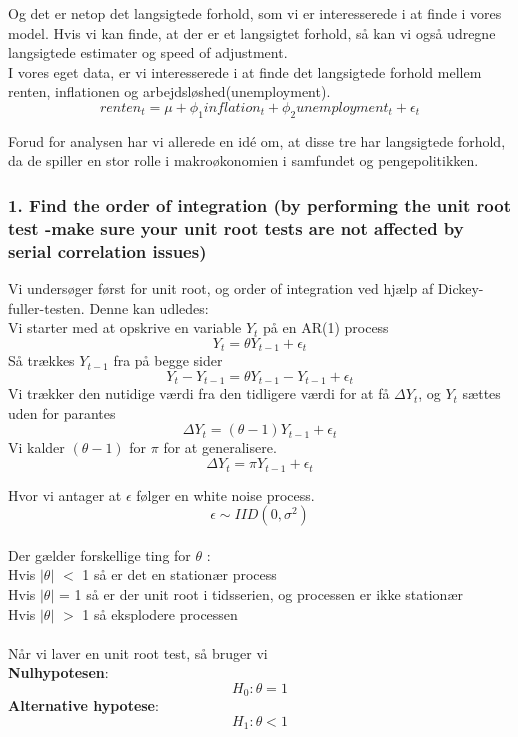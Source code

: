 \documentclass[
  10pt,
]{article}
\begin{document}
Og det er netop det langsigtede forhold, som vi er interesserede i at
finde i vores model. Hvis vi kan finde, at der er et langsigtet forhold,
så kan vi også udregne langsigtede estimater og speed of adjustment.\\
I vores eget data, er vi interesserede i at finde det langsigtede
forhold mellem renten, inflationen og arbejdsløshed(unemployment).
\[renten_t = \mu + \phi_1 inflation_t + \phi_2 unemployment_t + \epsilon_t \]

Forud for analysen har vi allerede en idé om, at disse tre har
langsigtede forhold, da de spiller en stor rolle i makroøkonomien i
samfundet og pengepolitikken.

\newpage

\hypertarget{find-the-order-of-integration-by-performing-the-unit-root-test--make-sure-your-unit-root-tests-are-not-affected-by-serial-correlation-issues}{%
\subsubsection{1. Find the order of integration (by performing the unit
root test -make sure your unit root tests are not affected by serial
correlation
issues)}\label{find-the-order-of-integration-by-performing-the-unit-root-test--make-sure-your-unit-root-tests-are-not-affected-by-serial-correlation-issues}}

Vi undersøger først for unit root, og order of integration ved hjælp af
Dickey-fuller-testen. Denne kan udledes:\\

Vi starter med at opskrive en variable \(Y_t\) på en AR(1) process\\
\[Y_t = \theta Y_{t-1} + \epsilon_t\] Så trækkes \(Y_{t-1}\) fra på
begge sider \[ Y_{t} - Y_{t-1}=\theta Y_{t-1}-Y_{t-1}+\epsilon_{t} \] Vi
trækker den nutidige værdi fra den tidligere værdi for at få
\(\Delta Y_t\), og \(Y_t\) sættes uden for parantes
\[\Delta Y_t=(\theta-1)Y_{t-1}+\epsilon_t    \] Vi kalder \((\theta-1)\)
for \(\pi\) for at generalisere.
\[\Delta Y_t=\pi Y_{t-1} + \epsilon_t    \]

Hvor vi antager at \(\epsilon\) følger en white noise process.\\
\[\epsilon \sim IID(0,\sigma^2)\]\\
Der gælder forskellige ting for \(\theta\) :\\
Hvis \(|\theta|\) \(<\) 1 så er det en stationær process\\
Hvis \(|\theta|\) = 1 så er der unit root i tidsserien, og processen er
ikke stationær\\
Hvis \(|\theta|\) \(>\) 1 så eksplodere processen\\
~\\
Når vi laver en unit root test, så bruger vi\\
\textbf{Nulhypotesen}: \[H_0: \theta = 1 \tag{Unit root} \]
\textbf{Alternative hypotese}: \[H_1: \theta < 1  \tag{No unit root} \]
\end{document}
